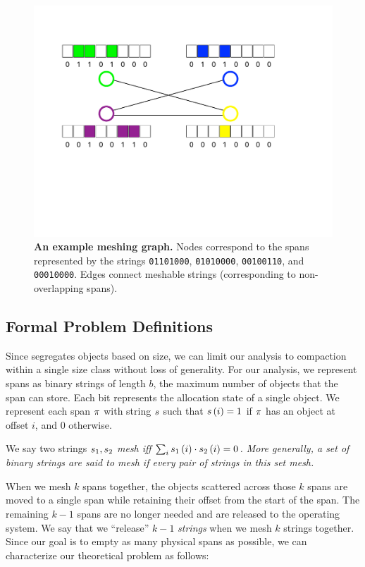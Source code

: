 \begin{figure}[!t]
  \centering
  \includegraphics[width=.5\textwidth]{Chapters/mesh/figures/graph-diagram.pdf}
\caption{\textbf{An example meshing graph.}  Nodes correspond to the spans represented by the strings \texttt{01101000}, \texttt{01010000}, \texttt{00100110}, and \texttt{00010000}.  Edges connect meshable strings (corresponding to non-overlapping spans).}\label{fig:exmesh}
\end{figure}


\subsection{Formal Problem Definitions}
\label{subsec:probdef}
Since \Mesh{} segregates objects based on size, we can limit our
analysis to compaction within a single size class without loss of
generality. For our analysis, we represent spans as binary strings of
length $b$, the maximum number of objects that the span can
store. Each bit represents the allocation state of a single object. We
represent each span $\pi$ with string $s$ such that $s\left(
i\right) = 1$ if $\pi$ has an object at offset $i$, and 0 otherwise.

\begin{definition}
We say  two  strings $s_{1}, s_{2}$ \em{mesh} iff $\sum_i s_{1}\left( i\right) \cdot s_{2} \left( i \right) = 0$. More generally, a set of binary strings are said to mesh if every pair of strings in this set mesh.
\end{definition}

When we mesh $k$ spans together, the objects scattered across those
$k$ spans are moved to a single span while retaining their offset from
the start of the span. The remaining $k-1$ spans are no longer needed
and are released to the operating system. We say that we ``release''
$k-1$ \emph{strings} when we mesh $k$ strings together.  Since our
goal is to empty as many physical spans as possible, we can
characterize our theoretical problem as follows:

